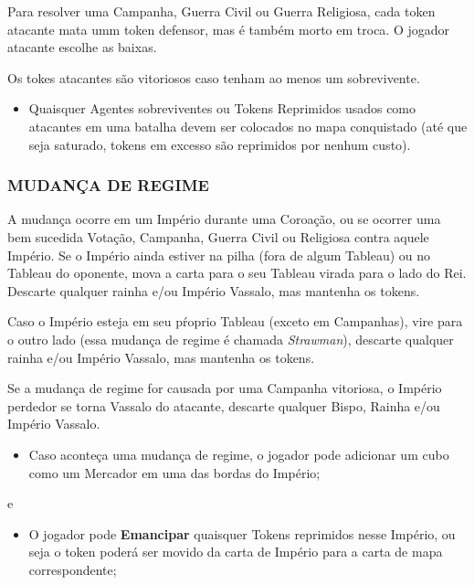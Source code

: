 \documentclass[11pt]{article}
\begin{document}
Para resolver uma Campanha, Guerra Civil ou Guerra Religiosa, cada token atacante mata umm token defensor, mas é também morto em troca. O jogador atacante escolhe as baixas.

Os tokes atacantes são vitoriosos caso tenham ao menos um sobrevivente.

\begin{itemize}
\item Quaisquer Agentes sobreviventes ou Tokens Reprimidos usados como atacantes em uma batalha devem ser colocados no mapa conquistado (até que seja saturado, tokens em excesso são reprimidos por nenhum custo).
\end{itemize}

\subsubsection{MUDANÇA DE REGIME}
\label{sec:orgac4aa41}

A mudança ocorre em um Império durante uma Coroação, ou se ocorrer uma bem sucedida Votação, Campanha, Guerra Civil ou Religiosa contra aquele Império. Se o Império ainda estiver na pilha (fora de algum Tableau)
ou no Tableau do oponente, mova a carta para o seu Tableau virada para o lado do Rei. Descarte qualquer rainha e/ou Império Vassalo, mas mantenha os tokens.

Caso o Império esteja em seu pŕoprio Tableau (exceto em Campanhas), vire para o outro lado (essa mudança de regime é chamada \emph{Strawman}), descarte qualquer rainha e/ou Império Vassalo, mas mantenha os tokens.

Se a mudança de regime for causada por uma Campanha vitoriosa, o Império perdedor se torna Vassalo do atacante, descarte qualquer Bispo, Rainha e/ou Império Vassalo.

\begin{itemize}
\item Caso aconteça uma mudança de regime, o jogador pode adicionar um cubo como um Mercador em uma das bordas do Império;
\end{itemize}

e

\begin{itemize}
\item O jogador pode \textbf{Emancipar} quaisquer Tokens reprimidos nesse Império, ou seja o token poderá ser movido da carta de Império para a carta de mapa correspondente;
\end{itemize}
\end{document}
